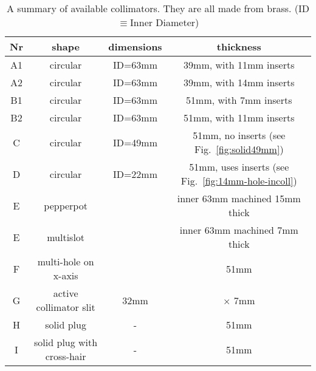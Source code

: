 \documentclass[11pt]{report}
\begin{document}
\begin{table}[!ht]
\centering
\begin{tabular}{c|c|c|c}
\hline
Nr & shape & dimensions & thickness\\
\hline
\hline
A1 & circular & ID=63mm    &  39mm, with 11mm inserts \\
A2 & circular & ID=63mm    &  39mm, with 14mm inserts \\
B1 & circular & ID=63mm    &  51mm, with 7mm  inserts \\
B2 & circular & ID=63mm    &  51mm, with 11mm inserts \\
C & circular  & ID=49mm    &  51mm, no inserts (see Fig.~\ref{fig:solid49mm})\\
D & circular  & ID=22mm    &  51mm, uses inserts (see Fig.~\ref{fig:14mm-hole-incoll}) \\
E & pepperpot &            & inner 63mm machined 15mm thick \\
E & multislot &            & inner 63mm machined 7mm thick \\
F & multi-hole on x-axis   &      & 51mm \\
G & active collimator slit & 32mm & $\times$ 7mm \\
H & solid plug             & -    & 51mm \\
I & solid plug with cross-hair & -& 51mm \\
\hline
\hline
\end{tabular}
\caption{A summary of available collimators. They are all made from brass.
(ID$\equiv$Inner Diameter)}
\label{table:collimators}
\end{table}
\end{document}
